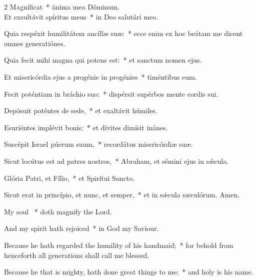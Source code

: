 \documentclass[12pt]{book}
\begin{document}
%
%    

\myrule




\begin{paracol}{2}
\lettrine{M}agníficat~* ánima mea Dóminum.\\ Et exsultávit spíritus meus~* in Deo salutári meo.

 Quia respéxit humilitátem ancíllæ suæ:~* ecce enim ex hoc beátam me dicent o\-mnes generatiónes.

 Quia fecit mihi magna qui potens est:~* et san\-ctum nomen ejus.

 Et misericórdia ejus a progénie in progénies~* timéntibus eum.

 Fecit poténtiam in bráchio suo:~* dispérsit supérbos mente cordis sui.

 Depósuit poténtes de sede,~* et exaltávit húmiles.

 Esuriéntes implévit bonis:~* et dívites dimísit inánes.

 Suscépit Israel púerum suum,~* recordátus misericórdiæ suæ.

 Sicut locútus est ad patres no\-stros,~* Abraham, et sémini ejus in sǽcula.

 Glória Patri, et Fílio,~* et Spirítui San\-cto.

 Sicut erat in princípio, et nunc, et semper,~* et in sǽcula sæculórum. Amen.
 
 \switchcolumn
 \begin{enpars}
My soul \cc~* doth magnify the Lord.

And my spirit hath rejoiced~* in God my Saviour.

Because he hath regarded the humility of his handmaid;~* for behold from henceforth all generations shall call me blessed.

Because he that is mighty, hath done great things to me;~* and holy is his name.


\end{enpars}
\end{paracol}
\end{document}

